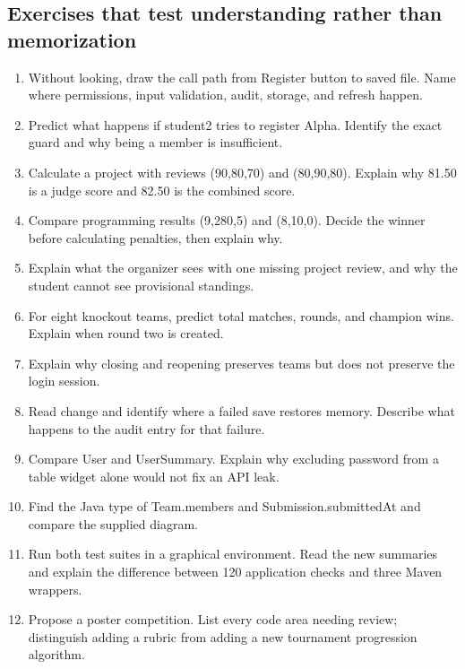 \documentclass[12pt]{article}
\begin{document}
\subsection{Exercises that test understanding rather than memorization}
\begin{enumerate}
\item Without looking, draw the call path from Register button to saved file. Name where permissions, input validation, audit, storage, and refresh happen.
\item Predict what happens if student2 tries to register Alpha. Identify the exact guard and why being a member is insufficient.
\item Calculate a project with reviews (90,80,70) and (80,90,80). Explain why 81.50 is a judge score and 82.50 is the combined score.
\item Compare programming results (9,280,5) and (8,10,0). Decide the winner before calculating penalties, then explain why.
\item Explain what the organizer sees with one missing project review, and why the student cannot see provisional standings.
\item For eight knockout teams, predict total matches, rounds, and champion wins. Explain when round two is created.
\item Explain why closing and reopening preserves teams but does not preserve the login session.
\item Read change and identify where a failed save restores memory. Describe what happens to the audit entry for that failure.
\item Compare User and UserSummary. Explain why excluding password from a table widget alone would not fix an API leak.
\item Find the Java type of Team.members and Submission.submittedAt and compare the supplied diagram.
\item Run both test suites in a graphical environment. Read the new summaries and explain the difference between 120 application checks and three Maven wrappers.
\item Propose a poster competition. List every code area needing review; distinguish adding a rubric from adding a new tournament progression algorithm.
\end{enumerate}
\end{document}
